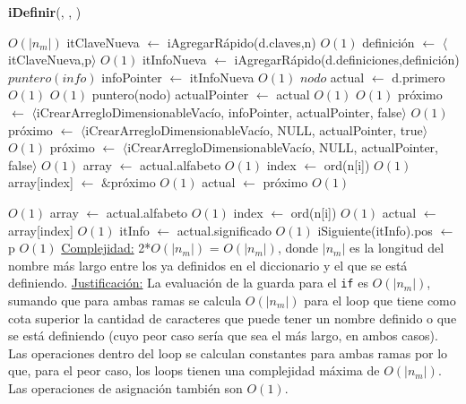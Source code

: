 \begin{Algoritmos}
\begin{algorithm}[H]{\textbf{iDefinir}(, , )}
	\begin{algorithmic}
    	\Comment $O(|n_{m}|)$
   	\State itClaveNueva $\gets$ iAgregarRápido(d.claves,n) \Comment $O(1)$
    \State definición $\gets$ $\langle$itClaveNueva,p$\rangle$ \Comment $O(1)$
    \State itInfoNueva $\gets$ iAgregarRápido(d.definiciones,definición)
	\State $puntero(info)$ infoPointer $\gets$ itInfoNueva $O(1)$
    \State $nodo$ actual $\gets$ d.primero \Comment $O(1)$
	 \Comment $O(1)$
    \State puntero(nodo) actualPointer $\gets$ actual  $O(1)$
        $O(1)$  
         \State próximo $\gets$ $\langle$iCrearArregloDimensionableVacío, infoPointer, actualPointer, false$\rangle$ \Comment $O(1)$
    \Else
    \State próximo $\gets$ $\langle$iCrearArregloDimensionableVacío, NULL, actualPointer, true$\rangle$ \Comment $O(1)$
    \Else
    	\State próximo $\gets$ $\langle$iCrearArregloDimensionableVacío, NULL, actualPointer, false$\rangle$ \Comment $O(1)$
    \EndIf
    \EndIf
	\State array $\gets$ actual.alfabeto \Comment $O(1)$
   	\State index $\gets$ ord(n[i]) \Comment $O(1)$
	\State array[index] $\gets$ $\&$próximo \Comment $O(1)$
    \State actual $\gets$ próximo \Comment $O(1)$
    \EndFor \par
\Else 
{} \Comment $O(1)$
	\State array $\gets$ actual.alfabeto  \Comment $O(1)$
   	\State index $\gets$ ord(n[i]) \Comment $O(1)$
	\State actual $\gets$ array[index] \Comment $O(1)$
\EndFor
\State itInfo $\gets$ actual.significado \Comment $O(1)$
\State iSiguiente(itInfo).pos $\gets$ p  \Comment $O(1)$
 \EndIf
\Statex \underline{Complejidad:} 2*$O(|n_{m}|)$ = $O(|n_{m}|)$, donde $|n_{m}|$ es la longitud del nombre más largo entre los ya definidos en el diccionario y el que se está definiendo.
        \Statex \underline{Justificación:} La evaluación de la guarda para el \texttt{if} es $O(|n_{m}|)$, sumando que para ambas ramas se calcula $O(|n_{m}|)$ para el loop que tiene como cota superior la cantidad de caracteres que puede tener un nombre definido o que se está definiendo (cuyo peor caso sería que sea el más largo, en ambos casos). Las operaciones dentro del loop se calculan constantes para ambas ramas por lo que, para el peor caso, los loops tienen una complejidad máxima de $O(|n_{m}|)$. Las operaciones de asignación también son $O(1)$.
	\end{algorithmic}
\end{algorithm}


\end{Algoritmos}
